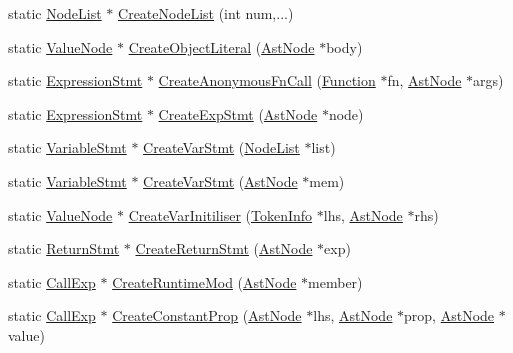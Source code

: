 \begin{DoxyCompactItemize}
static \hyperlink{classmocha_1_1_node_list}{NodeList} $\ast$ \hyperlink{classmocha_1_1_ast_utils_a491e3a29ccd8515edd75f7ad1658ff03}{CreateNodeList} (int num,...)
\item 
static \hyperlink{classmocha_1_1_value_node}{ValueNode} $\ast$ \hyperlink{classmocha_1_1_ast_utils_a20a30d91e2013c43e91d20c01f6b4eb8}{CreateObjectLiteral} (\hyperlink{classmocha_1_1_ast_node}{AstNode} $\ast$body)
\item 
static \hyperlink{classmocha_1_1_expression_stmt}{ExpressionStmt} $\ast$ \hyperlink{classmocha_1_1_ast_utils_ae8ac7a22a62b0cf12490efdd1c054045}{CreateAnonymousFnCall} (\hyperlink{classmocha_1_1_function}{Function} $\ast$fn, \hyperlink{classmocha_1_1_ast_node}{AstNode} $\ast$args)
\item 
static \hyperlink{classmocha_1_1_expression_stmt}{ExpressionStmt} $\ast$ \hyperlink{classmocha_1_1_ast_utils_a2ad830d99f87e4aa99eb7b77ffcd8f60}{CreateExpStmt} (\hyperlink{classmocha_1_1_ast_node}{AstNode} $\ast$node)
\item 
static \hyperlink{classmocha_1_1_variable_stmt}{VariableStmt} $\ast$ \hyperlink{classmocha_1_1_ast_utils_aa7d849cc4fe5b84c9aa80c81904931fb}{CreateVarStmt} (\hyperlink{classmocha_1_1_node_list}{NodeList} $\ast$list)
\item 
static \hyperlink{classmocha_1_1_variable_stmt}{VariableStmt} $\ast$ \hyperlink{classmocha_1_1_ast_utils_aaac13a7c6db56f228165461c8e41e427}{CreateVarStmt} (\hyperlink{classmocha_1_1_ast_node}{AstNode} $\ast$mem)
\item 
static \hyperlink{classmocha_1_1_value_node}{ValueNode} $\ast$ \hyperlink{classmocha_1_1_ast_utils_a9fcb6a0bd018a4d1a98c600287f5db18}{CreateVarInitiliser} (\hyperlink{classmocha_1_1_token_info}{TokenInfo} $\ast$lhs, \hyperlink{classmocha_1_1_ast_node}{AstNode} $\ast$rhs)
\item 
static \hyperlink{classmocha_1_1_return_stmt}{ReturnStmt} $\ast$ \hyperlink{classmocha_1_1_ast_utils_acde244c3e7c6107360bc0340fa73e8ea}{CreateReturnStmt} (\hyperlink{classmocha_1_1_ast_node}{AstNode} $\ast$exp)
\item 
static \hyperlink{classmocha_1_1_call_exp}{CallExp} $\ast$ \hyperlink{classmocha_1_1_ast_utils_ad4547f1789aba2e0857a51a02312b7ca}{CreateRuntimeMod} (\hyperlink{classmocha_1_1_ast_node}{AstNode} $\ast$member)
\item 
static \hyperlink{classmocha_1_1_call_exp}{CallExp} $\ast$ \hyperlink{classmocha_1_1_ast_utils_adebbc56fb60852df97fc8c14ca15bc63}{CreateConstantProp} (\hyperlink{classmocha_1_1_ast_node}{AstNode} $\ast$lhs, \hyperlink{classmocha_1_1_ast_node}{AstNode} $\ast$prop, \hyperlink{classmocha_1_1_ast_node}{AstNode} $\ast$value)

\end{DoxyCompactItemize}
